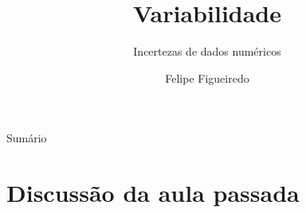 \documentclass{beamer}
\title%
{Variabilidade}
\subtitle
{Incertezas de dados numéricos} %
\author%
{Felipe Figueiredo}%
\institute[] %
{
}
\date%
{}
\begin{document}
\begin{frame}
  \titlepage
\end{frame}

\begin{frame}{Sumário}
  \tableofcontents
\end{frame}








\section{Discussão da aula passada}
\end{document}
